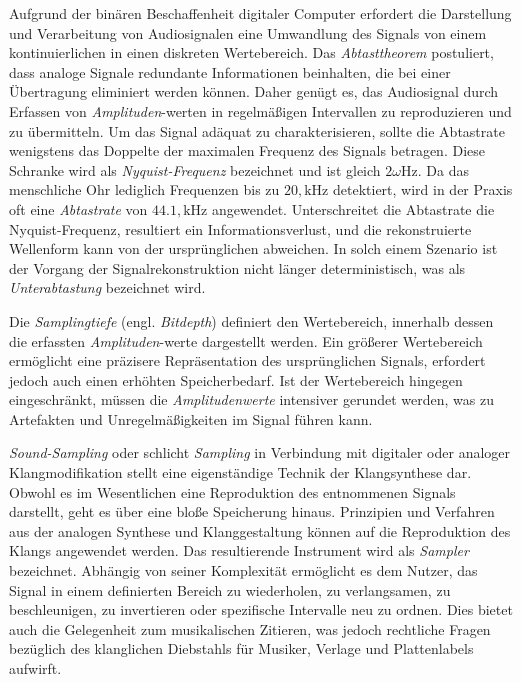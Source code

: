 \documentclass[
  a4paper,  %
  twoside,  %
  bibliography=totoc,
  headsepline,
  cleardoublepage=empty,
  parskip=half,
  draft=false
]{scrbook}
\begin{document}
Aufgrund der binären Beschaffenheit digitaler Computer erfordert die Darstellung und Verarbeitung von Audiosignalen eine Umwandlung des Signals von einem kontinuierlichen in einen diskreten Wertebereich. Das \emph{Abtasttheorem} postuliert, dass analoge Signale redundante Informationen beinhalten, die bei einer Übertragung eliminiert werden können. Daher genügt es, das Audiosignal durch Erfassen von \emph{Amplituden}-werten in regelmäßigen Intervallen zu reproduzieren und zu übermitteln. Um das Signal adäquat zu charakterisieren, sollte die Abtastrate wenigstens das Doppelte der maximalen Frequenz des Signals betragen. Diese Schranke wird als \emph{Nyquist-Frequenz} bezeichnet und ist gleich $2 \omega \mathrm{Hz}$. Da das menschliche Ohr lediglich Frequenzen bis zu $20 , \text{kHz}$ detektiert, wird in der Praxis oft eine \emph{Abtastrate} von $44.1 , \text{kHz}$ angewendet. Unterschreitet die Abtastrate die Nyquist-Frequenz, resultiert ein Informationsverlust, und die rekonstruierte Wellenform kann von der ursprünglichen abweichen. In solch einem Szenario ist der Vorgang der Signalrekonstruktion nicht länger deterministisch, was als \emph{Unterabtastung} bezeichnet wird. \cite{lai_practical_2004, shannon_communication_1949, ruschkowski_elektronische_2019}

Die \emph{Samplingtiefe} (engl. \emph{Bitdepth}) definiert den Wertebereich, innerhalb dessen die erfassten \emph{Amplituden}-werte dargestellt werden. Ein größerer Wertebereich ermöglicht eine präzisere Repräsentation des ursprünglichen Signals, erfordert jedoch auch einen erhöhten Speicherbedarf. Ist der Wertebereich hingegen eingeschränkt, müssen die \emph{Amplitudenwerte} intensiver gerundet werden, was zu Artefakten und Unregelmäßigkeiten im Signal führen kann. \cite{thompson_understanding_2005}

\emph{Sound-Sampling} oder schlicht \emph{Sampling} in Verbindung mit digitaler oder analoger Klangmodifikation stellt eine eigenständige Technik der Klangsynthese dar. Obwohl es im Wesentlichen eine Reproduktion des entnommenen Signals darstellt, geht es über eine bloße Speicherung hinaus. Prinzipien und Verfahren aus der analogen Synthese und Klanggestaltung können auf die Reproduktion des Klangs angewendet werden. Das resultierende Instrument wird als \emph{Sampler} bezeichnet. Abhängig von seiner Komplexität ermöglicht es dem Nutzer, das Signal in einem definierten Bereich zu wiederholen, zu verlangsamen, zu beschleunigen, zu invertieren oder spezifische Intervalle neu zu ordnen. Dies bietet auch die Gelegenheit zum musikalischen Zitieren, was jedoch rechtliche Fragen bezüglich des klanglichen Diebstahls für Musiker, Verlage und Plattenlabels aufwirft. \cite{russ_sound_2009, ruschkowski_elektronische_2019, katz_capturing_2010}
\end{document}
